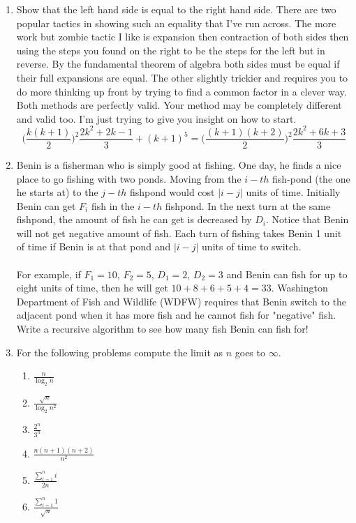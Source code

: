 \documentclass[12pt]{article}
\begin{document}
\begin{enumerate}
\item Show that the left hand side is equal to the right hand side. 
There are two popular tactics in showing such an equality that I've run across. 
The more work but zombie tactic I like is expansion then contraction of both sides then using
the steps you found on the right to be the steps for the left but in reverse. By the fundamental theorem of algebra
both sides must be equal if their full expansions are equal. The other slightly
trickier and requires you to do more thinking up front by trying to find a common factor
in a clever way. Both methods are perfectly valid. Your method may be completely different and valid too.
I'm just trying to give you insight on how to start.
$$\bigg(\frac{k(k + 1)}{2}\bigg)^2\frac{2k^2+2k-1}{3} + (k + 1)^5=\big(\frac{(k+1)(k + 2)}{2}\big)^2\frac{2k^2+6k+3}{3} $$
\newpage
\item Benin is a fisherman who is simply good at fishing. One day, he finds a nice place to go fishing with two ponds. 
Moving from the $i-th$ fish-pond (the one he starts at) to the $j-th$ fishpond would cost $|i - j|$ units of time. 
Initially Benin can get $F_i$ fish in the $i-th$ fishpond. 
In the next turn at the same fishpond, the amount of fish he can get is decreased by $D_i$. 
Notice that Benin will not get negative amount of fish.
Each turn of fishing takes Benin 1 unit of time if Benin is at that pond and $|i - j|$ units of time to switch.
\\\\
For example, if $F_1 = 10$, $F_2 = 5$, $D_1 = 2$, $D_2 = 3$ and Benin can fish for up to eight units of time, then he will get $10 + 8 + 6 + 5 + 4 = 33$.
Washington Department of Fish and Wildlife (WDFW) requires that Benin switch to the adjacent pond when it has more fish and he cannot fish for "negative" fish.
Write a recursive algorithm to see how many fish Benin can fish for!
\newpage
\item For the following problems compute the limit as $n$ goes to $\infty$.
\begin{enumerate}
\item $\frac{n}{\log_2{n}}$
\item $\frac{\sqrt{n}}{\log_2{n^2}}$
\item $\frac{2^n}{3^n}$
\item $\frac{n(n+1)(n+2)}{n^2}$
\item $\frac{\sum\limits_{i=1}^{n}i}{2n}$
\item $\frac{\sum\limits_{i=1}^{n}1}{\sqrt{n}}$
\end{enumerate}

\end{enumerate}
\end{document}
